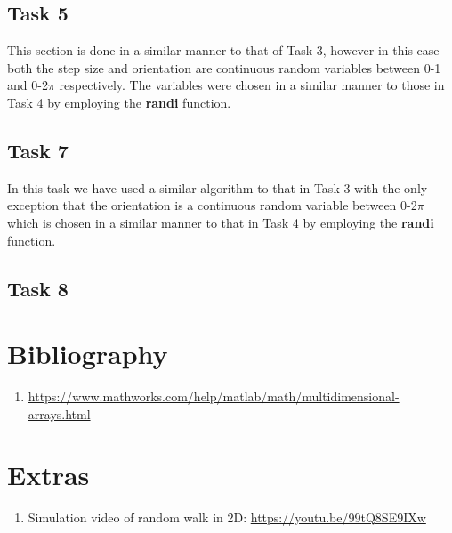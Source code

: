 \documentclass{article}
\begin{document}
\subsection{Task 5}
This section is done in a similar manner to that of Task 3, however in this case both the step size and orientation are continuous random variables between 0-1 and 0-2$\pi$ respectively. The variables were chosen in a similar manner to those in Task 4 by employing the \textbf{randi} function.
\subsection{Task 7}
In this task we have used a similar algorithm to that in Task 3 with the only exception that the orientation is a continuous random variable between 0-2$\pi$ which is chosen in a similar manner to that in Task 4 by employing the \textbf{randi} function. 
\subsection{Task 8}
\section{Bibliography}

\begin{enumerate}
    \item \url{https://www.mathworks.com/help/matlab/math/multidimensional-arrays.html}
\end{enumerate}

\section{Extras}
\begin{enumerate}
    \item Simulation video of random walk in 2D: \url{https://youtu.be/99tQ8SE9IXw}
\end{enumerate}
\end{document}
